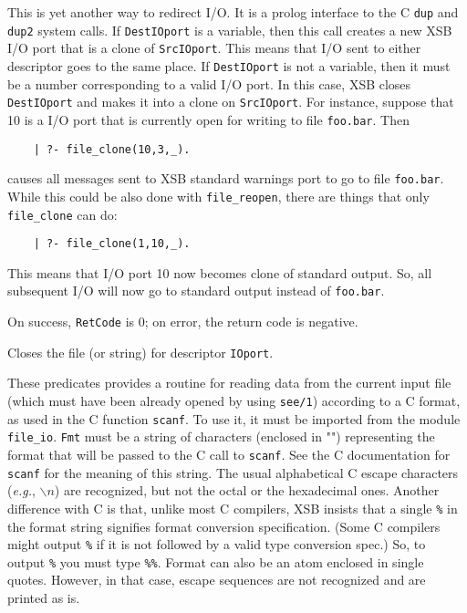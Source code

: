 \begin{description}
    This is yet another way to redirect I/O. It is a prolog interface to
    the C {\tt dup} and {\tt dup2} system calls. If {\tt DestIOport} is a
    variable, then this call creates a new XSB I/O port that is a
    clone of {\tt SrcIOport}. This means that I/O sent to either
    descriptor goes to the same place. If {\tt DestIOport} is not a
    variable, then it must be a number corresponding to a valid I/O
    port. In this case, XSB closes {\tt DestIOport} and makes it 
    into a clone on {\tt SrcIOport}. For instance, suppose that 10 is a
    I/O port that is currently open for writing to file {\tt foo.bar}.
    Then
    \begin{verbatim}
    | ?- file_clone(10,3,_).      
    \end{verbatim}
    causes all messages sent to XSB standard warnings port to go to file
    {\tt foo.bar}. While this could be also done with {\tt file\_reopen},
    there are things that only {\tt file\_clone} can do:
    \begin{verbatim}
    | ?- file_clone(1,10,_).      
    \end{verbatim}
    This means that I/O port 10 now becomes clone of standard
    output. So, all subsequent I/O will now go to standard output instead
    of {\tt foo.bar}. 

    On success, {\tt RetCode} is 0; on error, the return code is negative.

    Closes the file (or string) for descriptor {\tt IOport}.

    \newpage
    These predicates provides a routine for reading data from
    the current input file (which must have been already opened by using
    {\tt see/1}) according to a C format, as used in the C function
    {\tt scanf}. To use it, it must be imported from the module {\tt
    file\_io}.  {\tt Fmt} must be a string of characters (enclosed in "")
    representing the format that 
    will be passed to the C call to {\tt scanf}.  See the C
    documentation for {\tt scanf} for the meaning of this string.
    The usual alphabetical C escape characters ({\it e.g.}, $\backslash n$)
    are recognized, but not the octal or the hexadecimal ones.
    Another difference with C is that, unlike most C compilers, XSB insists
    that a single {\tt \%} in the format string signifies format conversion
    specification. (Some C compilers might output {\tt \%} if it is not
    followed by a valid type conversion spec.) So, to output {\tt \%}
    you must type {\tt \%\%}.
    Format can also be an atom enclosed in single quotes. However, in that
    case, escape sequences are not recognized and are printed as is.


\end{description}
